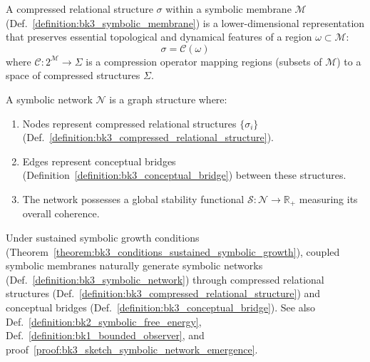 \begin{definition} \label{definition:bk3_compressed_relational_structure}
A compressed relational structure $\sigma$ within a symbolic membrane $\mathcal{M}$ (Def.~\ref{definition:bk3_symbolic_membrane}) is a lower-dimensional representation that preserves essential topological and dynamical features of a region $\omega \subset \mathcal{M}$:
\[
\sigma = \mathcal{C}(\omega)
\]
where $\mathcal{C}: 2^{\mathcal{M}} \rightarrow \Sigma$ is a compression operator mapping regions (subsets of $\mathcal{M}$) to a space of compressed structures $\Sigma$.
\end{definition}

\begin{definition} \label{definition:bk3_symbolic_network}
A symbolic network $\mathcal{N}$ is a graph structure where:
\begin{enumerate}
    \item Nodes represent compressed relational structures $\{\sigma_i\}$ (Def.~\ref{definition:bk3_compressed_relational_structure}).
    \item Edges represent conceptual bridges (Definition~\ref{definition:bk3_conceptual_bridge}) between these structures.
    \item The network possesses a global stability functional $\mathcal{S}: \mathcal{N} \rightarrow \mathbb{R}_+$ measuring its overall coherence.
\end{enumerate}
\end{definition}

\begin{theorem} \label{theorem:bk3_emergence_of_symbolic_networks}
Under sustained symbolic growth conditions (Theorem~\ref{theorem:bk3_conditions_sustained_symbolic_growth}), coupled symbolic membranes naturally generate symbolic networks (Def.~\ref{definition:bk3_symbolic_network}) through compressed relational structures (Def.~\ref{definition:bk3_compressed_relational_structure}) and conceptual bridges (Def.~\ref{definition:bk3_conceptual_bridge}).
See also Def.~\ref{definition:bk2_symbolic_free_energy}, Def.~\ref{definition:bk1_bounded_observer}, and proof~\ref{proof:bk3_sketch_symbolic_network_emergence}.
\end{theorem}

